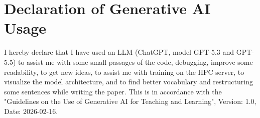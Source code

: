 \documentclass[sigconf, nonacm]{acmart}
\begin{document}
\section{Declaration of Generative AI Usage}
I hereby declare that I have used an LLM (ChatGPT, model GPT-5.3 and GPT-5.5) to assist me with some small passages of the code, debugging, improve some readability, to get new ideas, to assist me with training on the HPC server, to visualize the model architecture, and to find better vocabulary and restructuring some sentences while writing the paper. This is in accordance with the "Guidelines on the Use of Generative AI for Teaching and Learning", Version: 1.0, Date: 2026-02-16.

\end{document}
